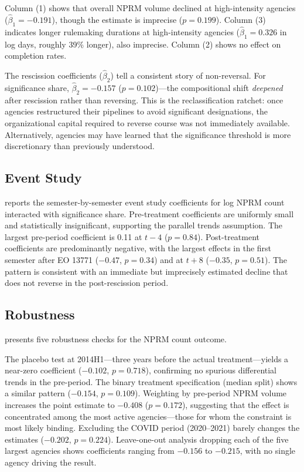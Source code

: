 \documentclass[12pt]{article}
\begin{document}
Column (1) shows that overall NPRM volume declined at high-intensity agencies ($\hat{\beta}_1 = -0.191$), though the estimate is imprecise ($p = 0.199$). Column (3) indicates longer rulemaking durations at high-intensity agencies ($\hat{\beta}_1 = 0.326$ in log days, roughly 39\% longer), also imprecise. Column (2) shows no effect on completion rates.

The rescission coefficients ($\hat{\beta}_2$) tell a consistent story of non-reversal. For significance share, $\hat{\beta}_2 = -0.157$ ($p = 0.102$)---the compositional shift \textit{deepened} after rescission rather than reversing. This is the reclassification ratchet: once agencies restructured their pipelines to avoid significant designations, the organizational capital required to reverse course was not immediately available. Alternatively, agencies may have learned that the significance threshold is more discretionary than previously understood.

\subsection{Event Study}

 reports the semester-by-semester event study coefficients for log NPRM count interacted with significance share. Pre-treatment coefficients are uniformly small and statistically insignificant, supporting the parallel trends assumption. The largest pre-period coefficient is 0.11 at $t-4$ ($p = 0.84$). Post-treatment coefficients are predominantly negative, with the largest effects in the first semester after EO 13771 ($-0.47$, $p = 0.34$) and at $t+8$ ($-0.35$, $p = 0.51$). The pattern is consistent with an immediate but imprecisely estimated decline that does not reverse in the post-rescission period.



\subsection{Robustness}

 presents five robustness checks for the NPRM count outcome.



The placebo test at 2014H1---three years before the actual treatment---yields a near-zero coefficient ($-0.102$, $p = 0.718$), confirming no spurious differential trends in the pre-period. The binary treatment specification (median split) shows a similar pattern ($-0.154$, $p = 0.109$). Weighting by pre-period NPRM volume increases the point estimate to $-0.408$ ($p = 0.172$), suggesting that the effect is concentrated among the most active agencies---those for whom the constraint is most likely binding. Excluding the COVID period (2020--2021) barely changes the estimates ($-0.202$, $p = 0.224$). Leave-one-out analysis dropping each of the five largest agencies shows coefficients ranging from $-0.156$ to $-0.215$, with no single agency driving the result.
\end{document}
